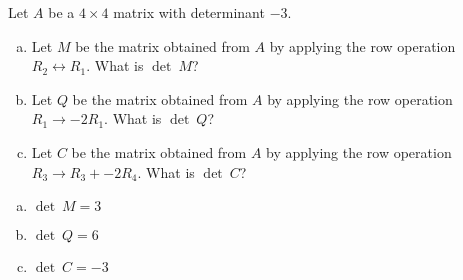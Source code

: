 
\begin{exerciseStatement}


Let \(A\) be a \(4 \times 4\) matrix with determinant \( -3 \).


\begin{enumerate}[(a)]
\item Let \(M\) be the matrix obtained from \(A\) by applying the row operation \( R_2 \leftrightarrow R_1 \). What is \(\operatorname{det}\ M\)?
\item Let \(Q\) be the matrix obtained from \(A\) by applying the row operation \( R_1 \to -2R_1 \). What is \(\operatorname{det}\ Q\)?
\item Let \(C\) be the matrix obtained from \(A\) by applying the row operation \( R_3 \to R_3 + -2R_4 \). What is \(\operatorname{det}\ C\)?
\end{enumerate}
    
\end{exerciseStatement}
    
\begin{exerciseAnswer} 

\begin{enumerate}[(a)]
\item \(\operatorname{det}\ M= 3 \)
\item \(\operatorname{det}\ Q= 6 \)
\item \(\operatorname{det}\ C= -3 \)
\end{enumerate}
    
\end{exerciseAnswer}
    
